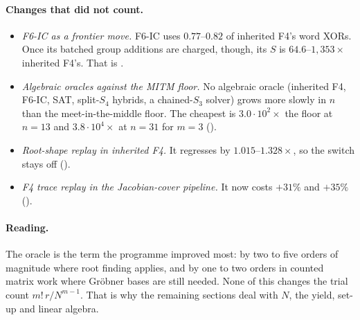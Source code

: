 \paragraph{Changes that did not count.}
\begin{itemize}
\item \emph{F6-IC as a frontier move.} F6-IC uses $0.77$--$0.82$ of
  inherited F4's word XORs. Once its batched group additions are charged,
  though, its $S$ is $64.6$--$1{,}353\times$ inherited F4's. That is
  .
\item \emph{Algebraic oracles against the MITM floor.} No algebraic oracle
  (inherited F4, F6-IC, SAT, split-$S_4$ hybrids, a chained-$S_3$ solver)
  grows more slowly in $n$ than the meet-in-the-middle floor. The cheapest
  is $3.0\cdot10^2\times$ the floor at $n=13$ and $3.8\cdot10^4\times$ at
  $n=31$ for $m=3$ ().
\item \emph{Root-shape replay in inherited F4.} It regresses by
  $1.015$--$1.328\times$, so the switch stays off
  ().
\item \emph{F4 trace replay in the Jacobian-cover pipeline.} It now costs
  $+31\%$ and $+35\%$ ().
\end{itemize}

\paragraph{Reading.} The oracle is the term the programme improved most:
by two to five orders of magnitude where root finding applies, and by one to
two orders in counted matrix work where Gr\"obner bases are still needed.
None of this changes the trial count $m!\,r/N^{m-1}$. That is why the
remaining sections deal with $N$, the yield, set-up and linear algebra.
